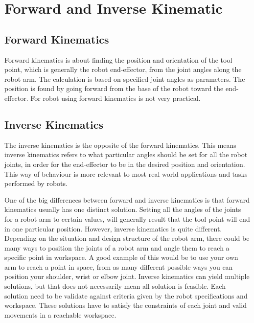 \section{Forward and Inverse Kinematic}

\subsection{Forward Kinematics}

Forward kinematics is about finding the position and orientation of the tool point, which is generally the robot end-effector, from the joint angles along the robot arm. The calculation is based on specified joint angles as parameters. The position is found by going forward from the base of the robot toward the end-effector. For robot using forward kinematics is not very practical. \cite{forward_kinematics}

\subsection{Inverse Kinematics}

The inverse kinematics is the opposite of the forward kinematics. This means inverse kinematics refers to what particular angles should be set for all the robot joints, in order for the end-effector to be in the desired position and orientation. This way of behaviour is more relevant to most real world applications and tasks performed by robots. \cite{inverse_kinematics}

One of the big differences between forward and inverse kinematics is that forward kinematics usually has one distinct solution. Setting all the angles of the joints for a robot arm to certain values, will generally result that the tool point will end in one particular position. However, inverse kinematics is quite different. Depending on the situation and design structure of the robot arm, there could be many ways to position the joints of a robot arm and angle them to reach a specific point in workspace. A good example of this would be to use your own arm to reach a point in space, from as many different possible ways you can position your shoulder, wrist or elbow joint. Inverse kinematics can yield multiple solutions, but that does not necessarily mean all solution is feasible. Each solution need to be validate against criteria given by the robot specifications and workspace. These solutions have to satisfy the constraints of each joint and valid movements in a reachable workspace.
